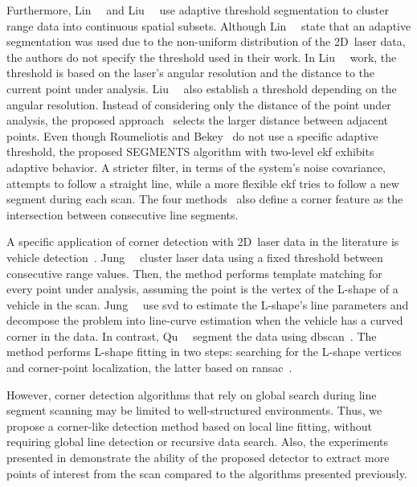 Furthermore, Lin~\etal~\cite{lin:yac:2017} and
Liu~\etal~\cite{liu:electronics:2022,liu:sensors:2023} use adaptive threshold
segmentation to cluster range data into continuous spatial subsets.
Although Lin~\etal~\cite{lin:yac:2017} state that an adaptive segmentation
was used due to the non-uniform distribution of the 2D~laser data,
the authors do not specify the threshold used in their work.
In Liu~\etal~\cite{liu:electronics:2022} work, the threshold is based on
the laser's angular resolution and the distance to
the current point under analysis.
Liu~\etal~\cite{liu:sensors:2023} also establish a threshold depending on
the angular resolution. Instead of considering only the distance of
the point under analysis, the proposed approach~\cite{liu:sensors:2023} selects
the larger distance between adjacent points.
Even though Roumeliotis and Bekey~\cite{roumeliotis-bekey:iros:2000} do not use
a specific adaptive threshold, the proposed SEGMENTS algorithm with two-level
\gls{ekf} exhibits adaptive behavior. A stricter filter,
in terms of the system's noise covariance, attempts to follow a straight line,
while a more flexible \gls{ekf} tries to follow a new segment during each scan.
The four methods~\cite{lin:yac:2017,liu:electronics:2022,liu:sensors:2023,roumeliotis-bekey:iros:2000}
also define a corner feature as the intersection
between consecutive line segments.

A specific application of corner detection with 2D~laser data in the literature
is vehicle detection~\cite{jung:tits:2008,qu:robio:2018}.
Jung~\etal~\cite{jung:tits:2008} cluster laser data using a fixed threshold
between consecutive range values. Then, the method performs template matching
for every point under analysis, assuming the point is
the vertex of the L-shape of a vehicle in the scan.
Jung~\etal~\cite{jung:tits:2008} use \gls{svd} to estimate the L-shape's
line parameters and decompose the problem into line-curve estimation
when the vehicle has a curved corner in the data.
In contrast, Qu~\etal~\cite{qu:robio:2018} segment the data using
\gls{dbscan}~\cite{ester:kdd:1996}.
The method performs L-shape fitting in two steps:
searching for the L-shape vertices and corner-point localization,
the latter based on \gls{ransac}~\cite{fischler-bolles:cacm:1981}.

However, corner detection algorithms that rely on global search during
line segment scanning may be limited to well-structured environments.
Thus, we propose a corner-like detection method based on local line fitting,
without requiring global line detection or recursive data search.
Also, the experiments presented in  demonstrate
the ability of the proposed detector to extract more points of interest
from the scan compared to the algorithms presented previously.


